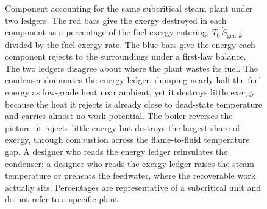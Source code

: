 \begin{figure}[htbp]
\centering
{}
\caption[Exergy destruction vs energy rejection by component]{Component
accounting for the same subcritical steam plant under two ledgers. The red bars
give the exergy destroyed in each component as a percentage of the fuel exergy
entering, $T_0\,\dot S_{\mathrm{gen},k}$ divided by the fuel exergy rate. The
blue bars give the energy each component rejects to the surroundings under a
first-law balance. The two ledgers disagree about where the plant wastes its
fuel. The condenser dominates the energy ledger, dumping nearly half the fuel
energy as low-grade heat near ambient, yet it destroys little exergy because the
heat it rejects is already close to dead-state temperature and carries almost no
work potential. The boiler reverses the picture: it rejects little energy but
destroys the largest share of exergy, through combustion across the flame-to-fluid
temperature gap. A designer who reads the energy ledger reinsulates the condenser;
a designer who reads the exergy ledger raises the steam temperature or preheats
the feedwater, where the recoverable work actually sits. Percentages are
representative of a subcritical unit and do not refer to a specific plant.}
\label{fig:vol04ch04:exergy-destruction-bars}
\end{figure}
